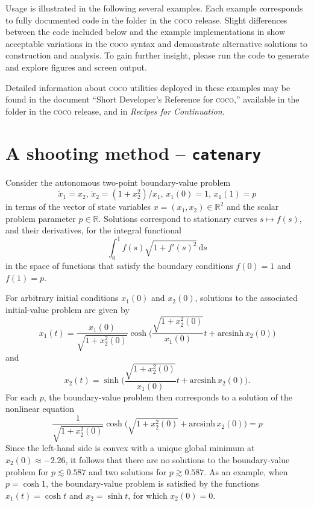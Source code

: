 Usage is illustrated in the following several examples. Each example corresponds to fully documented code in the  folder in the \textsc{coco} release. Slight differences between the code included below and the example implementations in  show acceptable variations in the \textsc{coco} syntax and demonstrate alternative solutions to construction and analysis. To gain further insight, please run the code to generate and explore figures and screen output.

Detailed information about \textsc{coco} utilities deployed in these examples may be found in the document ``Short Developer's Reference for \textsc{coco},'' available in the  folder in the \textsc{coco} release, and in \emph{Recipes for Continuation}.

\section{A shooting method -- \texttt{catenary}}
Consider the autonomous two-point boundary-value problem
\begin{equation}
\dot{x}_1=x_2,\,\dot{x}_2=(1+x_2^2)/x_1,\,x_1(0)=1,\,x_1(1)=p
\end{equation}
in terms of the vector of state variables $x=(x_1,x_2)\in\mathbb{R}^2$ and the scalar problem parameter $p\in\mathbb{R}$. Solutions correspond to stationary curves $s\mapsto f(s)$, and their derivatives, for the integral functional
\begin{equation}
\int_0^1 f(s)\sqrt{1+f'(s)^2}\,\mathrm{d}s
\end{equation}
in the space of functions that satisfy the boundary conditions $f(0)=1$ and $f(1)=p$.

For arbitrary initial conditions $x_1(0)$ and $x_2(0)$, solutions to the associated initial-value problem are given by
\begin{equation}
x_1(t)=\frac{x_1(0)}{\sqrt{1+x_2^2(0)}}\cosh\bigg(\frac{\sqrt{1+x_2^2(0)}}{x_1(0)}t+\mathrm{arcsinh}\, x_2(0)\bigg)
\end{equation}
and
\begin{equation}
x_2(t)=\sinh\bigg(\frac{\sqrt{1+x_2^2(0)}}{x_1(0)}t+\mathrm{arcsinh}\, x_2(0)\bigg).
\end{equation}
For each $p$, the boundary-value problem then corresponds to a solution of the nonlinear equation
\begin{equation}
\frac{1}{\sqrt{1+x_2^2(0)}}\cosh\bigg(\sqrt{1+x_2^2(0)}+\mathrm{arcsinh}\, x_2(0)\bigg)=p
\end{equation}
Since the left-hand side is convex with a unique global minimum at $x_2(0)\approx-2.26$, it follows that there are no solutions to the boundary-value problem for $p\lesssim 0.587$ and two solutions for $p\gtrsim 0.587$. As an example, when $p=\cosh 1$, the boundary-value problem is satisfied by the functions $x_1(t)=\cosh t$ and $x_2=\sinh t$, for which $x_2(0)=0$.

